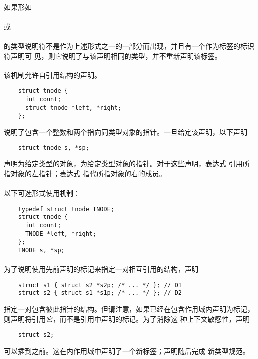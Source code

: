 {\paragraph{}
如果形如                                                                      \\
\mbox{\hspace{4em}}                            \\
或                                                                            \\
\mbox{\hspace{4em} }                                  \\
的类型说明符不是作为上述形式之一的一部分而出现，并且有一个作为标签的标识符声明可
见，则它说明了与该声明相同的类型，并不重新声明该标签。

\paragraph{}
\ex 该机制允许自引用结构的声明。
\begin{lstlisting}
    struct tnode {
      int count;
      struct tnode *left, *right;
    };
\end{lstlisting}
说明了包含一个整数和两个指向同类型对象的指针。一旦给定该声明，以下声明
\begin{lstlisting}
    struct tnode s, *sp;
\end{lstlisting}
声明为给定类型的对象，为给定类型对象的指针。对于这些声明，表达式
引用所指对象的左指针；表达式
指代所指对象的右的成员。

\paragraph{}
以下可选形式使用机制：
\begin{lstlisting}
    typedef struct tnode TNODE;
    struct tnode {
      int count;
      TNODE *left, *right;
    };
    TNODE s, *sp;
\end{lstlisting}

\paragraph{}
\ex 为了说明使用先前声明的标记来指定一对相互引用的结构，声明
\begin{lstlisting}
    struct s1 { struct s2 *s2p; /* ... */ }; // D1
    struct s2 { struct s1 *s1p; /* ... */ }; // D2
\end{lstlisting}
指定一对包含彼此指针的结构。但请注意，如果已经在包含作用域内声明为标记，
则声明将引用\textit{它}，而不是引用中声明的标记。为了消除这
种上下文敏感性，声明
\begin{lstlisting}
    struct s2;
\end{lstlisting}
可以插到之前。这在内作用域中声明了一个新标签；声明随后完成
新类型规范。

}
